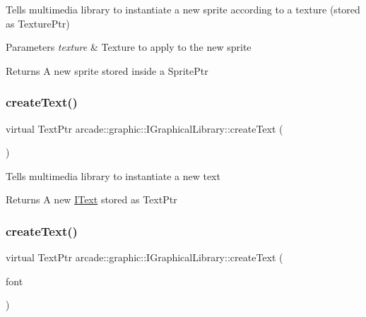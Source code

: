 Tells multimedia library to instantiate a new sprite according to a texture (stored as Texture\+Ptr) 
\begin{DoxyParams}{Parameters}
{\em texture} & Texture to apply to the new sprite \\
\hline
\end{DoxyParams}
\begin{DoxyReturn}{Returns}
A new sprite stored inside a Sprite\+Ptr 
\end{DoxyReturn}
\mbox{\label{classarcade_1_1graphic_1_1_i_graphical_library_a574563b85a4ed24d884381a31e95e888}} 
\subsubsection{\texorpdfstring{createText()}{createText()}\hspace{0.1cm}{\footnotesize\ttfamily [1/2]}}
{\footnotesize\ttfamily virtual Text\+Ptr arcade\+::graphic\+::\+I\+Graphical\+Library\+::create\+Text (\begin{DoxyParamCaption}{ }\end{DoxyParamCaption})\hspace{0.3cm}{\ttfamily [pure virtual]}}

Tells multimedia library to instantiate a new text \begin{DoxyReturn}{Returns}
A new \mbox{\hyperlink{classarcade_1_1graphic_1_1_i_text}{I\+Text}} stored as Text\+Ptr 
\end{DoxyReturn}
\mbox{\label{classarcade_1_1graphic_1_1_i_graphical_library_ac43fde5e21945aaccba8414dbadcb1ce}} 
\subsubsection{\texorpdfstring{createText()}{createText()}\hspace{0.1cm}{\footnotesize\ttfamily [2/2]}}
{\footnotesize\ttfamily virtual Text\+Ptr arcade\+::graphic\+::\+I\+Graphical\+Library\+::create\+Text (\begin{DoxyParamCaption}\item[{I\+Font\+Ptr}]{font }\end{DoxyParamCaption})\hspace{0.3cm}{\ttfamily [pure virtual]}}

